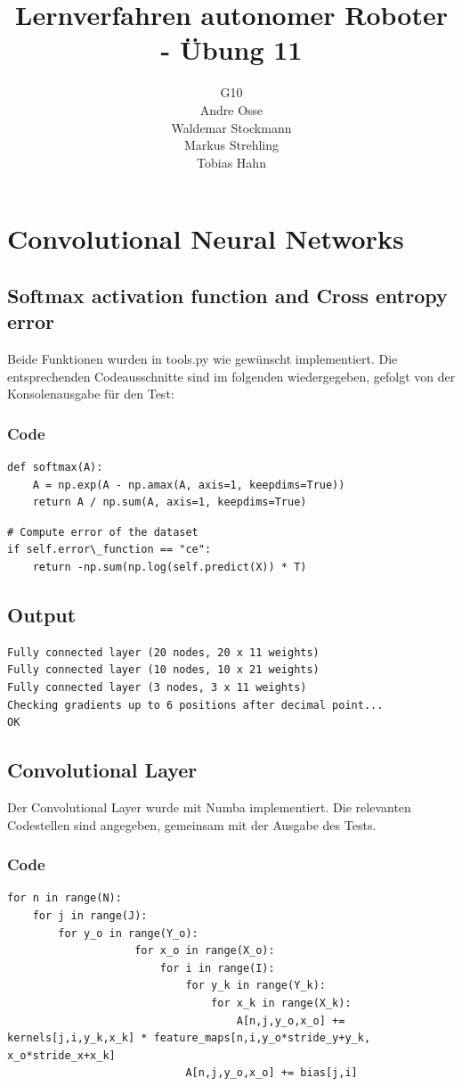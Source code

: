 \documentclass{article}
\title{Lernverfahren autonomer Roboter - Übung 11}
\author{G10\\ Andre Osse\\ Waldemar Stockmann\\ Markus Strehling\\ Tobias Hahn}
\begin{document}
\maketitle
\newpage
\section{Convolutional Neural Networks}

\subsection{Softmax activation function and Cross entropy error}
Beide Funktionen wurden in tools.py wie gewünscht implementiert. Die entsprechenden Codeausschnitte sind im folgenden wiedergegeben, gefolgt von der Konsolenausgabe für den Test:

\subsubsection{Code}
\begin{lstlisting}[caption=Softmax]
def softmax(A):
    A = np.exp(A - np.amax(A, axis=1, keepdims=True))
    return A / np.sum(A, axis=1, keepdims=True)
\end{lstlisting}

\begin{lstlisting}[caption=Cross entropy error]
# Compute error of the dataset
if self.error\_function == "ce":
	return -np.sum(np.log(self.predict(X)) * T)
\end{lstlisting}

\subsection{Output}
\begin{lstlisting}[caption=MLNN Classification Test Output]
Fully connected layer (20 nodes, 20 x 11 weights)
Fully connected layer (10 nodes, 10 x 21 weights)
Fully connected layer (3 nodes, 3 x 11 weights)
Checking gradients up to 6 positions after decimal point...
OK
\end{lstlisting}

\subsection{Convolutional Layer}
Der Convolutional Layer wurde mit Numba implementiert. Die relevanten Codestellen sind angegeben, gemeinsam mit der Ausgabe des Tests.

\subsubsection{Code}
\begin{lstlisting}[caption=Convolve]
for n in range(N):
	for j in range(J):
		for y_o in range(Y_o):
                    for x_o in range(X_o):
                        for i in range(I):
                            for y_k in range(Y_k):
                                for x_k in range(X_k):
                                    A[n,j,y_o,x_o] += kernels[j,i,y_k,x_k] * feature_maps[n,i,y_o*stride_y+y_k, x_o*stride_x+x_k]
                            A[n,j,y_o,x_o] += bias[j,i]
\end{lstlisting}
\end{document}
